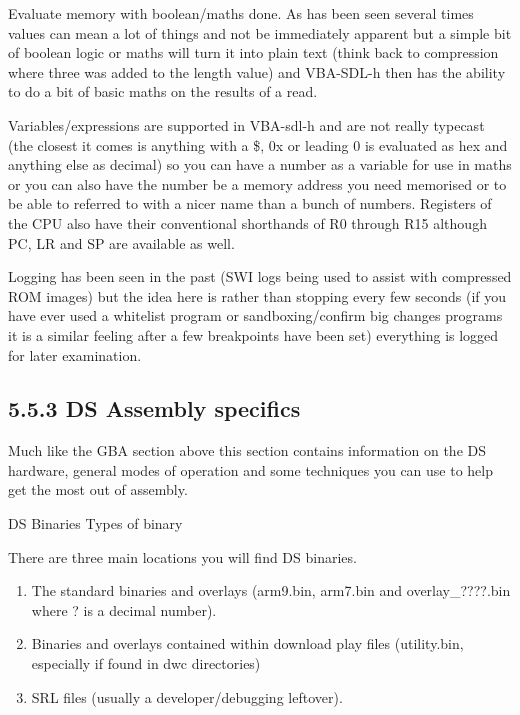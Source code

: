 \documentclass[
]{book}
\providecommand{\tightlist}{%
  \setlength{\itemsep}{0pt}\setlength{\parskip}{0pt}}
\begin{document}
Evaluate memory with boolean/maths done. As has been seen several times values can mean a lot of things and not be immediately apparent but a simple bit of boolean logic or maths will turn it into plain text (think back to compression where three was added to the length value) and VBA-SDL-h then has the ability to do a bit of basic maths on the results of a read.

Variables/expressions are supported in VBA-sdl-h and are not really typecast (the closest it comes is anything with a \$, 0x or leading 0 is evaluated as hex and anything else as decimal) so you can have a number as a variable for use in maths or you can also have the number be a memory address you need memorised or to be able to referred to with a nicer name than a bunch of numbers. Registers of the CPU also have their conventional shorthands of R0 through R15 although PC, LR and SP are available as well.

Logging has been seen in the past (SWI logs being used to assist with compressed ROM images) but the idea here is rather than stopping every few seconds (if you have ever used a whitelist program or sandboxing/confirm big changes programs it is a similar feeling after a few breakpoints have been set) everything is logged for later examination.

\hypertarget{ds-assembly-specifics}{%
\subsection{5.5.3 DS Assembly specifics}\label{ds-assembly-specifics}}

Much like the GBA section above this section contains information on the DS hardware, general modes of operation and some techniques you can use to help get the most out of assembly.

DS Binaries Types of binary

There are three main locations you will find DS binaries.

\begin{enumerate}
\def\labelenumi{\arabic{enumi}.}
\tightlist
\item
  The standard binaries and overlays (arm9.bin, arm7.bin and overlay\_????.bin where ? is a decimal number).
\item
  Binaries and overlays contained within download play files (utility.bin, especially if found in dwc directories)
\item
  SRL files (usually a developer/debugging leftover).
\end{enumerate}
\end{document}
